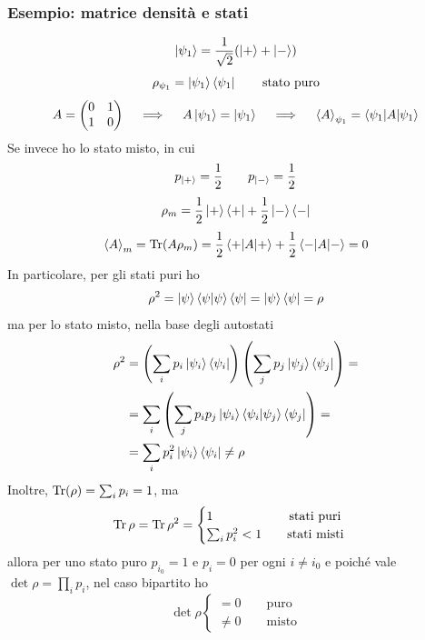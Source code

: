 \subsubsection{Esempio: matrice densità e stati}
\[
\ket{\psi_1} = \frac{1}{\sqrt{2}} (\ket{+} + \ket{-})
\]
\[
\rho_{\psi_1} = \ket{\psi_1} \bra{\psi_1} \qquad \text{stato puro}
\]
\[
A = \begin{pmatrix}
0 & 1 \\
1 & 0
\end{pmatrix} \quad \implies \quad A \ket{\psi_1} = \ket{\psi_1} \quad \implies \quad \braket{A}_{\psi_1} = \braket{\psi_1|A|\psi_1}
\]
Se invece ho lo stato misto, in cui
\[
p_{\ket{+}} = \frac{1}{2} \qquad p_{\ket{-}} = \frac{1}{2}
\]
\[
\rho_m = \frac{1}{2} \ket{+} \bra{+} + \frac{1}{2} \ket{-} \bra{-}
\]
\[
\braket{A}_m = \operatorname{Tr}(A\rho_m) = \frac{1}{2} \braket{+|A|+} + \frac{1}{2} \braket{-|A|-} = 0
\]
In particolare, per gli stati puri ho
\[
\rho^2 = \ket{\psi} \braket{\psi|\psi} \bra{\psi} = \ket{\psi} \bra{\psi} = \rho
\]
ma per lo stato misto, nella base degli autostati
\begin{align*}
\rho^2 &= \left( \sum_i p_i \ket{\psi_i} \bra{\psi_i} \right) \left( \sum_j p_j \ket{\psi_j} \bra{\psi_j} \right) = \\
&= \sum_i \left( \sum_j p_i p_j \ket{\psi_i} \braket{\psi_i|\psi_j} \bra{\psi_j} \right) = \\
&= \sum_i p_i^2 \ket{\psi_i} \bra{\psi_i} \ne \rho
\end{align*}
Inoltre, \(\operatorname{Tr}(\rho) = \sum_i p_i = 1\), ma
\[
\operatorname{Tr} \rho = \operatorname{Tr} \rho^2 = \begin{cases}
1 \qquad \qquad  \qquad\text{stati puri} \\
\sum_i p_i^2 < 1 \qquad \text{stati misti}
\end{cases}
\]
allora per uno stato puro \(p_{i_0} = 1\) e \(p_i = 0\) per ogni \(i \ne i_0\) e poiché vale \(\det \rho = \prod_i p_i\),  nel caso bipartito ho
\[
\det \rho \begin{cases}
= 0 \qquad \text{puro} \\
\ne 0 \qquad \text{misto}
\end{cases}
\]

